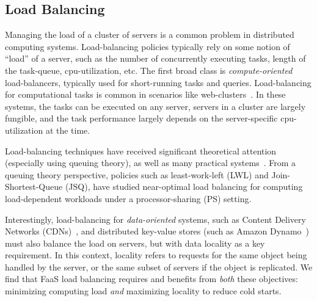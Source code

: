 \subsection{Load Balancing}

Managing the load of a cluster of servers is a common problem in distributed computing systems.
Load-balancing policies typically rely on some notion of ``load'' of a server, such as the number of concurrently executing tasks, length of the task-queue, cpu-utilization, etc.
%
The first broad class is \emph{compute-oriented} load-balancers, typically used for short-running tasks and queries. 
Load-balancing for computational tasks is common in scenarios like web-clusters~\cite{karger1999web}. 
In these systems, the tasks can be executed on any server,  servers in a cluster are largely fungible, and the task performance largely depends on the server-specific cpu-utilization at the time.

Load-balancing techniques have received significant theoretical attention (especially using queuing theory), as well as many practical systems~\cite{decandia2007dynamo}. 
From a queuing theory perspective, policies such as least-work-left (LWL) and Join-Shortest-Queue (JSQ), have studied near-optimal load balancing for computing load-dependent workloads under a processor-sharing (PS) setting. 

Interestingly, load-balancing for \emph{data-oriented} systems, such as Content Delivery Networks (CDNs)~\cite{nygren2010akamai}, and distributed key-value stores (such as Amazon Dynamo~\cite{decandia2007dynamo}) must also balance the load on servers, but with data locality as a key requirement.
In this context, locality refers to requests for the same object being handled by the server, or the same subset of servers if the object is replicated. 
We find that FaaS load balancing requires and benefits from \emph{both} these objectives: minimizing computing load \emph{and} maximizing locality to reduce cold starts. 

